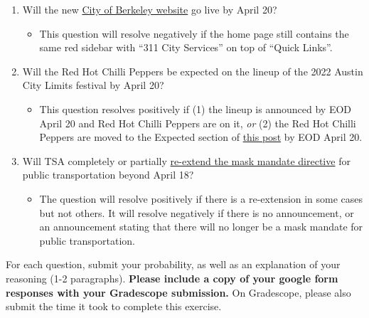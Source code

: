 \documentclass[11pt]{article}
\begin{document}
\begin{enumerate}
	\item Will the new \href{https://www.cityofberkeley.info/Home.aspx}{City of Berkeley website} go live by April 20?
	\begin{itemize}
		\item This question will resolve negatively if the home page still contains the same red sidebar with ``311 City Services'' on top of ``Quick Links''.
	\end{itemize} 
	\item Will the Red Hot Chilli Peppers be expected on the lineup of the 2022 Austin City Limits festival by April 20?
	\begin{itemize}
		\item This question resolves positively if (1) the lineup is announced by EOD April 20 and Red Hot Chilli Peppers are on it, \emph{or} (2) the Red Hot Chilli Peppers are moved to the Expected section of \href{https://www.reddit.com/r/aclfestival/comments/s6izhl/official_acl_2022_lineup_speculation_thread/}{this post} by EOD April 20.
	\end{itemize}
	\item Will TSA completely or partially \href{https://www.tsa.gov/news/press/statements/2022/03/10/statement-regarding-face-mask-use-public-transportation}{re-extend the mask mandate directive} for public transportation beyond April 18?
	\begin{itemize}
		\item The question will resolve positively if there is a re-extension in some cases but not others. It will resolve negatively if there is no announcement, or an announcement stating that there will no longer be a mask mandate for public transportation.
	\end{itemize}
\end{enumerate}

For each question, submit your probability, as well as an explanation of your reasoning (1-2 paragraphs). \textbf{Please include a copy of your google form responses with your Gradescope submission.} On Gradescope, please also submit the time it took to complete this exercise.
\end{document}
